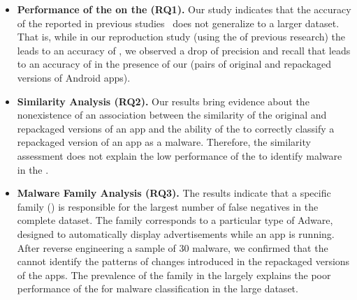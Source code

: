 \begin{itemize}
\item \textbf{Performance of the \mas on the \cds (RQ1).} 
  Our study indicates that the accuracy of the \mas reported in
  previous studies~\cite{DBLP:conf/wcre/BaoLL18,DBLP:journals/jss/CostaMMSSBNR22} does not
  generalize to a larger dataset. That is, while in our
  reproduction study (using the \sds of previous research) the \mas
  leads to an accuracy of \fscoreSmall, we observed a drop of precision and recall
  that leads to an accuracy of \fscore in the presence of our \cds (\apps pairs of
  original and repackaged versions of Android apps). 


\item \textbf{Similarity Analysis (RQ2).} Our results bring evidence about the nonexistence of an 
  association between the similarity of the original and repackaged versions of an app
  and the ability of the \mas to correctly
  classify a repackaged version of an app as a malware. Therefore,
  the similarity assessment does not explain the low
  performance of the \mas to identify malware in the \cds.

\item \textbf{Malware Family Analysis (RQ3).} The results indicate that a specific family
  (\gps)  is responsible for the largest number of false
  negatives in the complete dataset. The \gps family corresponds to a particular type of
  Adware, designed to automatically display advertisements while an app is running. After reverse engineering
  a sample of 30 \gps malware, we confirmed that the \mas cannot identify the
  patterns of changes introduced in the repackaged versions of the apps. The prevalence of the \gps family
  in the \cds largely explains the poor performance of the \mas for malware classification in the large dataset. 
\end{itemize}

